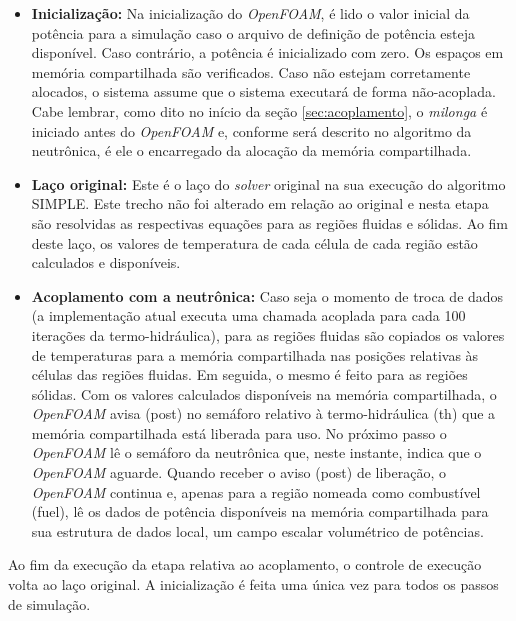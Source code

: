 \begin{itemize}
\item \textbf{Inicialização:} Na inicialização do \textit{OpenFOAM}, é lido o valor inicial da potência para
  a simulação caso o arquivo de definição de potência esteja disponível. Caso contrário, a potência é inicializado
  com zero. Os espaços em memória compartilhada são verificados. Caso não estejam corretamente alocados, o sistema
  assume que o sistema executará de forma não-acoplada. Cabe lembrar, como dito no início da seção \ref{sec:acoplamento},
  o \textit{milonga} é iniciado antes do \textit{OpenFOAM} e, conforme será descrito no algoritmo da neutrônica, é
  ele o encarregado da alocação da memória compartilhada.

\item \textbf{Laço original:} Este é o laço do \textit{solver} original na sua execução do algoritmo SIMPLE. Este
  trecho não foi alterado em relação ao original e nesta etapa são resolvidas as respectivas equações
  para as regiões fluidas e sólidas. Ao fim
  deste laço, os valores de temperatura de cada célula de cada região estão calculados e disponíveis.

\item \textbf{Acoplamento com a neutrônica:} Caso seja o momento de troca de dados (a implementação atual
  executa uma chamada acoplada para cada 100 iterações da termo-hidráulica), para as regiões fluidas são copiados os valores
  de temperaturas para a memória compartilhada nas posições relativas às células das regiões fluidas. Em seguida, o mesmo
  é feito para as regiões sólidas. Com os valores calculados disponíveis na memória compartilhada, o \textit{OpenFOAM}
  avisa (post) no semáforo relativo à termo-hidráulica (th) que a memória compartilhada está liberada para uso. No próximo
  passo o \textit{OpenFOAM} lê o semáforo da neutrônica que, neste instante, indica que o \textit{OpenFOAM} aguarde. Quando
  receber o aviso (post) de liberação, o \textit{OpenFOAM} continua e, apenas para a região nomeada como combustível (fuel),
  lê os dados de potência disponíveis na memória compartilhada para sua estrutura de dados local, um campo escalar volumétrico
  de potências.
\end{itemize}

Ao fim da execução da etapa relativa ao acoplamento, o controle de execução volta ao laço original. A inicialização é
feita uma única vez para todos os passos de simulação.

